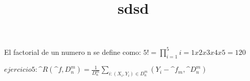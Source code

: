 \documentclass[a4paper]{article}
\title{sdsd}
\begin{document}
	\maketitle
El factorial de un numero n se define como: $5! = \prod_{i=1}^{5} i = 1x2x3x4x5 = 120$


$ejercicio 5: \^{R}(\^{f},D^{m}_{n}) = \frac{1}{D^{m}_{n}} \sum_{i:(X_{i},Y_{i}) \in D_{n}^{m}}(Y_{i}- \^{f}_{m},\^{D}_{n}^{m}) $
\end{document}
